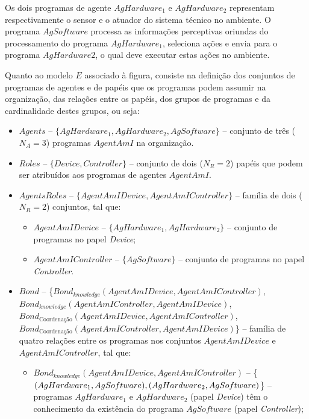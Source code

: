 Os dois programas de agente $AgHardware_1$ e $AgHardware_2$ representam respectivamente o sensor e o atuador do sistema técnico no ambiente. O programa $AgSoftware$ processa as informações perceptivas oriundas do processamento do programa $AgHardware_1$, seleciona ações e envia para o programa $AgHardware2$, o qual deve executar estas ações no ambiente.

Quanto ao modelo $E$ associado à figura, consiste na definição dos conjuntos de programas de agentes e de papéis que os programas podem assumir na organização, das relações entre os papéis, dos grupos de programas e da cardinalidade destes grupos, ou seja: 

\begin{itemize}
    \item $Agents$ --	$\{AgHardware_1, AgHardware_2, AgSoftware\}$ – conjunto de três ($N_A = 3$) programas $AgentAmI$ na organização.
    
    \item $Roles$ -- $\{Device, Controller\}$ – conjunto de dois ($N_R = 2$) papéis que podem ser atribuídos aos programas de agentes $AgentAmI$.
    
    \item $AgentsRoles$ -- $\{AgentAmIDevice, AgentAmIController\}$ – família de dois ($N_R = 2$) conjuntos, tal que:
    
    \begin{itemize}
        \item $AgentAmIDevice$ -- $\{AgHardware_1, AgHardware_2\}$ – conjunto de programas no papel \textit{Device};
        \item $AgentAmIController$ -- $\{AgSoftware\}$ – conjunto de programas no papel \textit{Controller}.
    \end{itemize}
    
    \item $Bond$ -- \{$Bond_{knowledge}(AgentAmIDevice, AgentAmIController)$, 
                    \\$Bond_{knowledge}(AgentAmIController, AgentAmIDevice)$,
                    \\$Bond_{\textrm{Coordenação}}(AgentAmIDevice, AgentAmIController)$, 
                    \\$Bond_{\textrm{Coordenação}}(AgentAmIController, AgentAmIDevice)$\} – família de quatro relações entre os programas nos conjuntos $AgentAmIDevice$ e $AgentAmIController$, tal que:
    \begin{itemize}
        
        \item $Bond_{knowledge}(AgentAmIDevice, AgentAmIController)$ --	\{$(AgHardware_1, AgSoftware), \\(AgHardware_2, AgSoftware)$\} – programas $AgHardware_1$ e $AgHardware_2$ (papel \textit{Device}) têm o conhecimento da existência do programa $AgSoftware$ (papel \textit{Controller});
        

\end{itemize}
\end{itemize}
